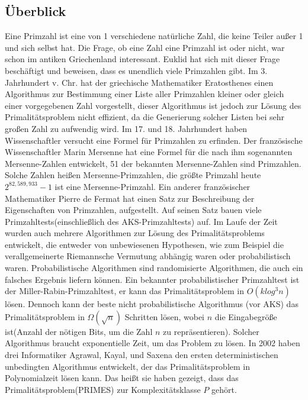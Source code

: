 \documentclass[12pt,oneside]{article}
\theoremstyle{remark}
\theoremstyle{definition}
\begin{document}
\subsection{Überblick}
Eine Primzahl ist eine von 1 verschiedene natürliche Zahl, die keine Teiler außer 1 und sich selbst hat. Die Frage, ob eine Zahl eine Primzahl ist oder nicht, war schon im antiken Griechenland interessant. Euklid hat sich mit dieser Frage beschäftigt und beweisen, dass es unendlich viele Primzahlen gibt. Im 3. Jahrhundert v. Chr. hat der griechische Mathematiker Eratosthenes einen Algorithmus zur Bestimmung einer Liste aller Primzahlen kleiner oder gleich einer vorgegebenen Zahl vorgestellt, dieser Algorithmus ist jedoch zur Lösung des Primalitätsproblem nicht effizient, da die Generierung solcher Listen bei sehr großen Zahl zu aufwendig wird. Im 17. und 18. Jahrhundert haben Wissenschaftler versucht eine Formel für Primzahlen zu erfinden. Der französische Wissenschaftler Marin Mersenne hat eine Formel für die nach ihm sogenannten Mersenne-Zahlen entwickelt, 51 der bekannten Mersenne-Zahlen sind Primzahlen. Solche Zahlen heißen Mersenne-Primzahlen, die größte Primzahl heute $2^{82,589,933} − 1$ ist eine Mersenne-Primzahl. Ein anderer französischer Mathematiker Pierre de Fermat hat einen Satz zur Beschreibung der Eigenschaften von Primzahlen, aufgestellt. Auf seinen Satz bauen viele Primzahltests(einschließlich des AKS-Primzahltests) auf. \newline\newline
Im Laufe der Zeit wurden auch mehrere Algorithmen zur Lösung des Primalitätsproblems entwickelt, die entweder von unbewiesenen Hypothesen, wie zum Beispiel die verallgemeinerte Riemannsche Vermutung abhängig waren oder probabilistisch waren. Probabilistische Algorithmen sind randomisierte Algorithmen, die auch ein falsches Ergebnis liefern können. Ein bekannter probabilistischer Primzahltest ist der Miller-Rabin-Primzahltest, er kann das Primalitätsproblem in $O(k log^3 n)$ lösen. Dennoch kann der beste nicht probabilistische Algorithmus (vor AKS) das Primalitätsproblem in $ \Omega(\sqrt{n}) $ Schritten lösen, wobei $n$ die Eingabegröße ist(Anzahl der nötigen Bits, um die Zahl $n$ zu repräsentieren). Solcher Algorithmus braucht exponentielle Zeit, um das Problem zu lösen. In 2002 haben drei Informatiker Agrawal, Kayal, und Saxena den ersten deterministischen unbedingten Algorithmus entwickelt, der das Primalitätsproblem in Polynomialzeit lösen kann. Das heißt sie haben gezeigt, dass das Primalitätsproblem(PRIMES) zur Komplexitätsklasse $P$ gehört.      
\end{document}
